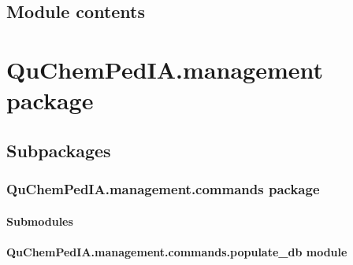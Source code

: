 \documentclass[letterpaper,10pt,english]{sphinxmanual}
\begin{document}
\subsection{Module contents}
\label{\detokenize{QuChemPedIA.QuChemPedIA_lib:module-QuChemPedIA.QuChemPedIA_lib}}\label{\detokenize{QuChemPedIA.QuChemPedIA_lib:module-contents}}

\section{QuChemPedIA.management package}
\label{\detokenize{QuChemPedIA.management:quchempedia-management-package}}\label{\detokenize{QuChemPedIA.management::doc}}

\subsection{Subpackages}
\label{\detokenize{QuChemPedIA.management:subpackages}}

\subsubsection{QuChemPedIA.management.commands package}
\label{\detokenize{QuChemPedIA.management.commands:quchempedia-management-commands-package}}\label{\detokenize{QuChemPedIA.management.commands::doc}}

\paragraph{Submodules}
\label{\detokenize{QuChemPedIA.management.commands:submodules}}

\paragraph{QuChemPedIA.management.commands.populate\_db module}
\label{\detokenize{QuChemPedIA.management.commands:module-QuChemPedIA.management.commands.populate_db}}\label{\detokenize{QuChemPedIA.management.commands:quchempedia-management-commands-populate-db-module}}
\end{document}
